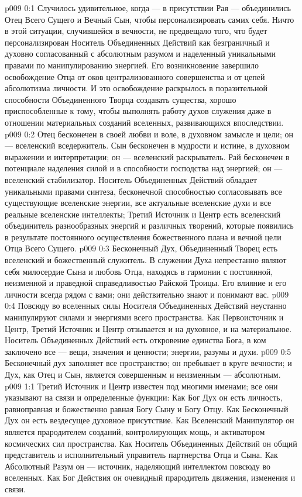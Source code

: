\author{Божественный Советник}
\vs p009 0:1 Случилось удивительное, когда --- в присутствии Рая --- объединились Отец Всего Сущего и Вечный Сын, чтобы персонализировать самих себя. Ничто в этой ситуации, случившейся в вечности, не предвещало того, что будет персонализирован Носитель Объединенных Действий как безграничный и духовно согласованный с абсолютным разумом и наделенный уникальными правами по манипулированию энергией. Его возникновение завершило освобождение Отца от оков централизованного совершенства и от цепей абсолютизма личности. И это освобождение раскрылось в поразительной способности Объединенного Творца создавать существа, хорошо приспособленные к тому, чтобы выполнять работу духов служения даже в отношении материальных созданий вселенных, развивающихся впоследствии.
\vs p009 0:2 \pc Отец бесконечен в своей любви и воле, в духовном замысле и цели; он --- вселенский вседержитель. Сын бесконечен в мудрости и истине, в духовном выражении и интерпретации; он --- вселенский раскрыватель. Рай бесконечен в потенциале наделения силой и в способности господства над энергией; он --- вселенский стабилизатор. Носитель Объединенных Действий обладает уникальными правами синтеза, бесконечной способностью согласовывать все существующие вселенские энергии, все актуальные вселенские духи и все реальные вселенские интеллекты; Третий Источник и Центр есть вселенский объединитель разнообразных энергий и различных творений, которые появились в результате постоянного осуществления божественного плана и вечной цели Отца Всего Сущего.
\vs p009 0:3 Бесконечный Дух, Объединенный Творец есть вселенский и божественный служитель. В служении Духа непрестанно являют себя милосердие Сына и любовь Отца, находясь в гармонии с постоянной, неизменной и праведной справедливостью Райской Троицы. Его влияние и его личности всегда рядом с вами; они действительно знают и понимают вас.
\vs p009 0:4 Повсюду во вселенных силы Носителя Объединенных Действий неустанно манипулируют силами и энергиями всего пространства. Как Первоисточник и Центр, Третий Источник и Центр отзывается и на духовное, и на материальное. Носитель Объединенных Действий есть откровение единства Бога, в ком заключено все --- вещи, значения и ценности; энергии, разумы и духи.
\vs p009 0:5 \pc Бесконечный дух заполняет все пространство; он пребывает в круге вечности; и Дух, как Отец и Сын, является совершенным и неизменным --- абсолютным.
\vs p009 1:1 Третий Источник и Центр известен под многими именами; все они указывают на связи и определенные функции: Как Бог Дух он есть личность, равноправная и божественно равная Богу Сыну и Богу Отцу. Как Бесконечный Дух он есть вездесущее духовное присутствие. Как Вселенский Манипулятор он является прародителем созданий, контролирующих мощь, и активатором космических сил пространства. Как Носитель Объединенных Действий он общий представитель и исполнительный управитель партнерства Отца и Сына. Как Абсолютный Разум он --- источник, наделяющий интеллектом повсюду во вселенных. Как Бог Действия он очевидный прародитель движения, изменения и связи.

